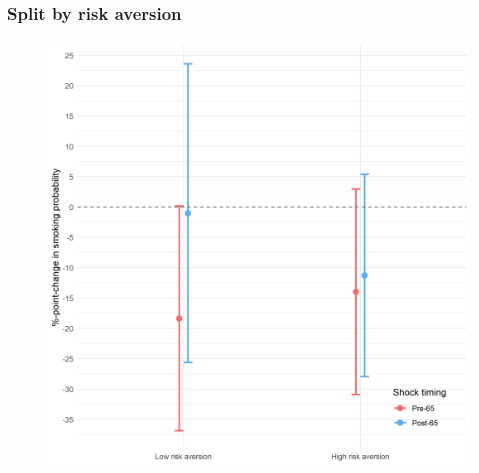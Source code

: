 \documentclass[10pt,compress,xcolor=dvipsnames]{beamer}    %
\newcounter{ex}
\newcommand{\1}[1]{\mathrm{1\hspace*{-2.5pt}l}[#1]}	%
\begin{document}
\begin{frame}
\frametitle{Split by risk aversion}

\begin{figure}[hbtp]
\centering
\includegraphics[height=0.8\textheight]{../../3_output/shock_effects/risk_6070_100_cvplot.png}
\label{fig:risk}
\end{figure}
\hyperlink{frame:otherX}{}
\end{frame}
\end{document}
